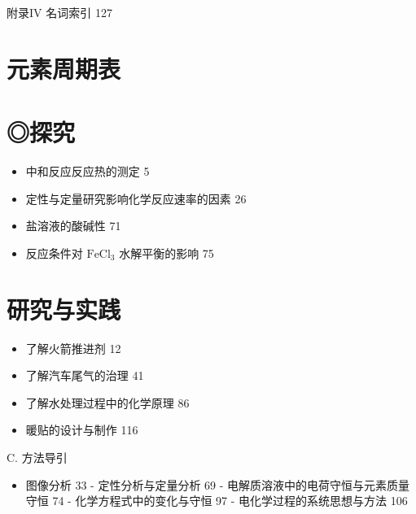 \documentclass[10pt]{article}
\begin{document}
附录IV 名词索引 127

\section*{元素周期表}

\section*{◎探究}

\begin{itemize}
\item 中和反应反应热的测定 5
\end{itemize}

\begin{itemize}
\item 定性与定量研究影响化学反应速率的因素 26
\end{itemize}

\begin{itemize}
\item 盐溶液的酸碱性 71
\end{itemize}

\begin{itemize}
\item 反应条件对 \({\mathrm{{FeCl}}}_{3}\) 水解平衡的影响 75
\end{itemize}

\section*{研究与实践}

\begin{itemize}
\item 了解火箭推进剂 12
\end{itemize}

\begin{itemize}
\item 了解汽车尾气的治理 41
\end{itemize}

\begin{itemize}
\item 了解水处理过程中的化学原理 86
\end{itemize}

\begin{itemize}
\item 暖贴的设计与制作 116
\end{itemize}

C. 方法导引

\begin{itemize}
\item 图像分析 33 - 定性分析与定量分析 69 - 电解质溶液中的电荷守恒与元素质量守恒 74 - 化学方程式中的变化与守恒 97 - 电化学过程的系统思想与方法 106
\end{itemize}
\end{document}

